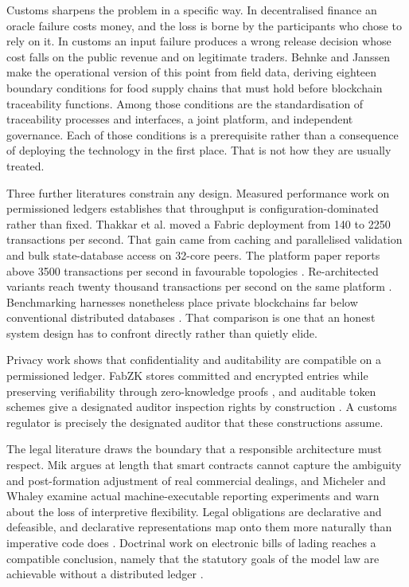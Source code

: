 \documentclass[information,article,submit,moreauthors]{Definitions/mdpi}
\begin{document}
Customs sharpens the problem in a specific way. In decentralised finance an oracle failure costs money, and the loss is borne by the participants who chose to rely on it. In customs an input failure produces a wrong release decision whose cost falls on the public revenue and on legitimate traders. Behnke and Janssen \cite{behnke2020boundary} make the operational version of this point from field data, deriving eighteen boundary conditions for food supply chains that must hold before blockchain traceability functions. Among those conditions are the standardisation of traceability processes and interfaces, a joint platform, and independent governance. Each of those conditions is a prerequisite rather than a consequence of deploying the technology in the first place. That is not how they are usually treated.

Three further literatures constrain any design. Measured performance work on permissioned ledgers establishes that throughput is configuration-dominated rather than fixed. Thakkar et al. \cite{thakkar2018benchmarking} moved a Fabric deployment from 140 to 2250 transactions per second. That gain came from caching and parallelised validation and bulk state-database access on 32-core peers. The platform paper reports above 3500 transactions per second in favourable topologies \cite{androulaki2018fabric}. Re-architected variants reach twenty thousand transactions per second on the same platform \cite{gorenflo2020fastfabric}. Benchmarking harnesses nonetheless place private blockchains far below conventional distributed databases \cite{dinh2017blockbench}. That comparison is one that an honest system design has to confront directly rather than quietly elide.

Privacy work shows that confidentiality and auditability are compatible on a permissioned ledger. FabZK stores committed and encrypted entries while preserving verifiability through zero-knowledge proofs \cite{kang2019fabzk}, and auditable token schemes give a designated auditor inspection rights by construction \cite{androulaki2020auditable}. A customs regulator is precisely the designated auditor that these constructions assume.

The legal literature draws the boundary that a responsible architecture must respect. Mik \cite{mik2017limitations} argues at length that smart contracts cannot capture the ambiguity and post-formation adjustment of real commercial dealings, and Micheler and Whaley \cite{micheler2020regtech} examine actual machine-executable reporting experiments and warn about the loss of interpretive flexibility. Legal obligations are declarative and defeasible, and declarative representations map onto them more naturally than imperative code does \cite{governatori2018legal}. Doctrinal work on electronic bills of lading reaches a compatible conclusion, namely that the statutory goals of the model law are achievable without a distributed ledger \cite{krebs2023blocking}.
\end{document}
